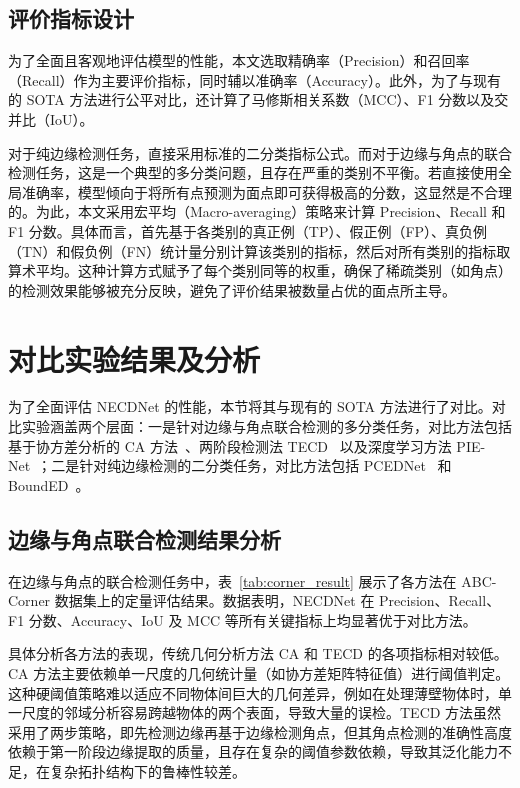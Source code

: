 \subsection{评价指标设计}

为了全面且客观地评估模型的性能，本文选取精确率（Precision）和召回率（Recall）作为主要评价指标，同时辅以准确率（Accuracy）。此外，为了与现有的 SOTA 方法进行公平对比，还计算了马修斯相关系数（MCC）、F1 分数以及交并比（IoU）。

对于纯边缘检测任务，直接采用标准的二分类指标公式。而对于边缘与角点的联合检测任务，这是一个典型的多分类问题，且存在严重的类别不平衡。若直接使用全局准确率，模型倾向于将所有点预测为面点即可获得极高的分数，这显然是不合理的。为此，本文采用宏平均（Macro-averaging）策略来计算 Precision、Recall 和 F1 分数。具体而言，首先基于各类别的真正例（TP）、假正例（FP）、真负例（TN）和假负例（FN）统计量分别计算该类别的指标，然后对所有类别的指标取算术平均。这种计算方式赋予了每个类别同等的权重，确保了稀疏类别（如角点）的检测效果能够被充分反映，避免了评价结果被数量占优的面点所主导。

\section{对比实验结果及分析}

为了全面评估 NECDNet 的性能，本节将其与现有的 SOTA 方法进行了对比。对比实验涵盖两个层面：一是针对边缘与角点联合检测的多分类任务，对比方法包括基于协方差分析的 CA 方法~\cite{bazazian_fast_2015}、两阶段检测法 TECD~\cite{ahmed_edge_2018} 以及深度学习方法 PIE-Net~\cite{wang_pienet_2020a}；二是针对纯边缘检测的二分类任务，对比方法包括 PCEDNet~\cite{himeur_pcednet_2022} 和 BoundED~\cite{bode_bounded_2023}。

\subsection{边缘与角点联合检测结果分析}

在边缘与角点的联合检测任务中，表~\ref{tab:corner_result} 展示了各方法在 ABC-Corner 数据集上的定量评估结果。数据表明，NECDNet 在 Precision、Recall、F1 分数、Accuracy、IoU 及 MCC 等所有关键指标上均显著优于对比方法。

具体分析各方法的表现，传统几何分析方法 CA 和 TECD 的各项指标相对较低。CA 方法主要依赖单一尺度的几何统计量（如协方差矩阵特征值）进行阈值判定。这种硬阈值策略难以适应不同物体间巨大的几何差异，例如在处理薄壁物体时，单一尺度的邻域分析容易跨越物体的两个表面，导致大量的误检。TECD 方法虽然采用了两步策略，即先检测边缘再基于边缘检测角点，但其角点检测的准确性高度依赖于第一阶段边缘提取的质量，且存在复杂的阈值参数依赖，导致其泛化能力不足，在复杂拓扑结构下的鲁棒性较差。


